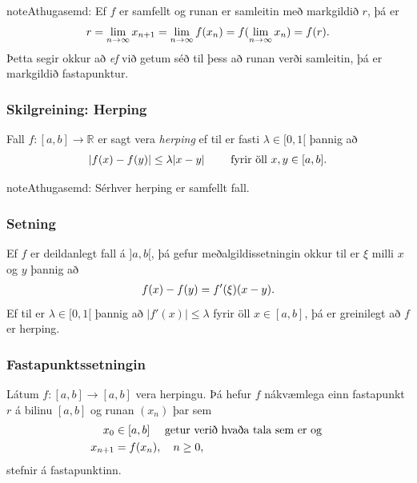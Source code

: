 \documentclass[a4paper,10pt,icelandic]{sphinxmanual}
\begin{document}
\begin{notice}{note}{Athugasemd:}
Ef \(f\) er samfellt og runan er samleitin með markgildið \(r\), þá er
\begin{gather}
\begin{split}r=\lim_{n\to \infty}x_{n+1}=\lim_{n\to \infty}f(x_{n})
=f(\lim_{n\to \infty}x_{n})=f(r).\end{split}\notag
\end{gather}
Þetta segir okkur að \emph{ef} við getum séð til þess að runan verði
samleitin, þá er markgildið fastapunktur.
\end{notice}


\subsubsection{Skilgreining: Herping}
\label{kafli02:index-3}\label{kafli02:skilgreining-herping}
Fall \(f:[a,b]\to {\mathbb  R}\) er sagt vera \emph{herping} ef til er
fasti \(\lambda\in [0,1[\) þannig að
\begin{gather}
\begin{split}|f(x)-f(y)|\leq \lambda|x-y| \qquad \text{ fyrir öll } x,y\in [a,b].\end{split}\notag
\end{gather}
\begin{notice}{note}{Athugasemd:}
Sérhver herping er samfellt fall.
\end{notice}


\subsubsection{Setning}
\label{kafli02:setning}
Ef \(f\) er deildanlegt fall á \(]a,b[\), þá gefur
meðalgildissetningin okkur til er \(\xi\) milli \(x\) og
\(y\) þannig að
\begin{gather}
\begin{split}f(x)-f(y)=f'(\xi)(x-y).\end{split}\notag
\end{gather}
Ef til er \(\lambda\in[0,1[\) þannig að \(|f'(x)|\leq \lambda\)
fyrir öll \(x\in [a,b]\), þá er greinilegt að \(f\) er herping.


\subsubsection{Fastapunktssetningin}
\label{kafli02:index-4}\label{kafli02:fastapunktssetningin}
Látum \(f : [a,b] \to [a,b]\) vera herpingu. Þá hefur \(f\)
nákvæmlega einn fastapunkt \(r\) á bilinu \([a,b]\) og runan
\((x_n)\) þar sem
\begin{gather}
\begin{split}\begin{aligned}
  x_0 &\in [a,b] \quad \text{ getur verið hvaða tala sem er  og } \\
  x_{n+1} &= f(x_n), \quad n \geq 0,\end{aligned}\end{split}\notag
\end{gather}
stefnir á fastapunktinn.
\end{document}
